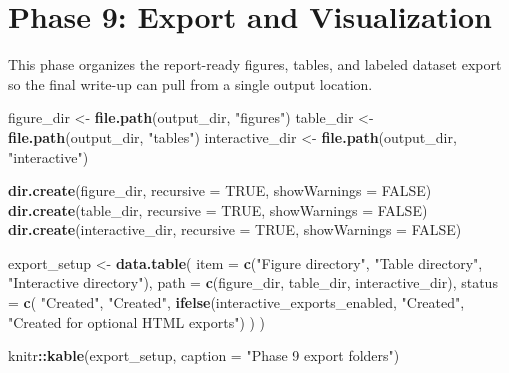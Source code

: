 \documentclass[
]{article}
\newenvironment{Shaded}{\begin{snugshade}}{\end{snugshade}}
\newcommand{\AttributeTok}[1]{\textcolor[rgb]{0.13,0.29,0.53}{#1}}
\newcommand{\ConstantTok}[1]{\textcolor[rgb]{0.56,0.35,0.01}{#1}}
\newcommand{\FunctionTok}[1]{\textcolor[rgb]{0.13,0.29,0.53}{\textbf{#1}}}
\newcommand{\NormalTok}[1]{#1}
\newcommand{\OtherTok}[1]{\textcolor[rgb]{0.56,0.35,0.01}{#1}}
\newcommand{\SpecialCharTok}[1]{\textcolor[rgb]{0.81,0.36,0.00}{\textbf{#1}}}
\newcommand{\StringTok}[1]{\textcolor[rgb]{0.31,0.60,0.02}{#1}}
\begin{document}
\section{Phase 9: Export and
Visualization}\label{phase-9-export-and-visualization}

This phase organizes the report-ready figures, tables, and labeled
dataset export so the final write-up can pull from a single output
location.

\begin{Shaded}
\begin{Highlighting}[]
\NormalTok{figure\_dir }\OtherTok{\textless{}{-}} \FunctionTok{file.path}\NormalTok{(output\_dir, }\StringTok{"figures"}\NormalTok{)}
\NormalTok{table\_dir }\OtherTok{\textless{}{-}} \FunctionTok{file.path}\NormalTok{(output\_dir, }\StringTok{"tables"}\NormalTok{)}
\NormalTok{interactive\_dir }\OtherTok{\textless{}{-}} \FunctionTok{file.path}\NormalTok{(output\_dir, }\StringTok{"interactive"}\NormalTok{)}

\FunctionTok{dir.create}\NormalTok{(figure\_dir, }\AttributeTok{recursive =} \ConstantTok{TRUE}\NormalTok{, }\AttributeTok{showWarnings =} \ConstantTok{FALSE}\NormalTok{)}
\FunctionTok{dir.create}\NormalTok{(table\_dir, }\AttributeTok{recursive =} \ConstantTok{TRUE}\NormalTok{, }\AttributeTok{showWarnings =} \ConstantTok{FALSE}\NormalTok{)}
\FunctionTok{dir.create}\NormalTok{(interactive\_dir, }\AttributeTok{recursive =} \ConstantTok{TRUE}\NormalTok{, }\AttributeTok{showWarnings =} \ConstantTok{FALSE}\NormalTok{)}

\NormalTok{export\_setup }\OtherTok{\textless{}{-}} \FunctionTok{data.table}\NormalTok{(}
  \AttributeTok{item =} \FunctionTok{c}\NormalTok{(}\StringTok{"Figure directory"}\NormalTok{, }\StringTok{"Table directory"}\NormalTok{, }\StringTok{"Interactive directory"}\NormalTok{),}
  \AttributeTok{path =} \FunctionTok{c}\NormalTok{(figure\_dir, table\_dir, interactive\_dir),}
  \AttributeTok{status =} \FunctionTok{c}\NormalTok{(}
    \StringTok{"Created"}\NormalTok{,}
    \StringTok{"Created"}\NormalTok{,}
    \FunctionTok{ifelse}\NormalTok{(interactive\_exports\_enabled, }\StringTok{"Created"}\NormalTok{, }\StringTok{"Created for optional HTML exports"}\NormalTok{)}
\NormalTok{  )}
\NormalTok{)}

\NormalTok{knitr}\SpecialCharTok{::}\FunctionTok{kable}\NormalTok{(export\_setup, }\AttributeTok{caption =} \StringTok{"Phase 9 export folders"}\NormalTok{)}
\end{Highlighting}
\end{Shaded}
\end{document}
